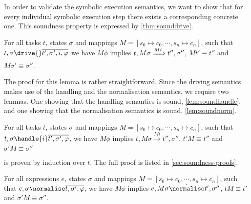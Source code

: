 %

In order to validate the symbolic execution semantics,
we want to show that for every individual symbolic execution step there exists a corresponding concrete one.
This soundness property is expressed by \cref{thm:sounddrive}.

\begin{theorem}
  \label{thm:sounddrive}

  For all tasks $t$, states $\sigma$ and mappings $M=[s_0\mapsto c_0,\cdots,s_n\mapsto c_n]$,
  such that $t,\sigma\drive{} \overline{t',\sigma',i,\phi}$
  we have $M\phi$ implies
  $t,M\sigma \xRightarrow[]{M i} t'',\sigma''$, $Mt' \equiv t''$ and $M\sigma' \equiv \sigma''$.
\end{theorem}

The proof for this lemma is rather straightforward.
Since the driving semantics makes use of the handling and the normalisation semantics, we require two lemmas.
One showing that the handling semantics is sound, \cref{lem:soundhandle}, and one showing that the normalisation semantics is sound, \cref{lem:soundnorm}.

\begin{lemma}
  \label{lem:soundhandle}

  For all tasks $t$, states $\sigma$ and mappings $M = [s_0\mapsto c_0,\cdots,s_n\mapsto c_n]$,
  such that $t,\sigma\handle{i} \overline{t',\sigma',\phi}$,
  we have $M\phi$ implies
  $t,M \sigma \xrightarrow[]{M i} t'',\sigma''$, $t'M \equiv t'' $ and $\sigma' M \equiv \sigma''$
\end{lemma}

 is proven by induction over $t$.
The full proof is listed in \cref{sec:soundness-proofs}.

\begin{lemma}
  \label{lem:soundnorm}

  For all expressions $e$, states $\sigma$ and mappings $M=[s_0\mapsto c_0,\cdots,s_n\mapsto c_n]$,
  such that $e,\sigma\normalise \overline{t,\sigma',\phi}$,
  we have $M\phi$ implies
  $e,M \sigma \hat{\normalise}t',\sigma''$, $t M \equiv t'$ and $\sigma' M \equiv \sigma''$.

\end{lemma}

